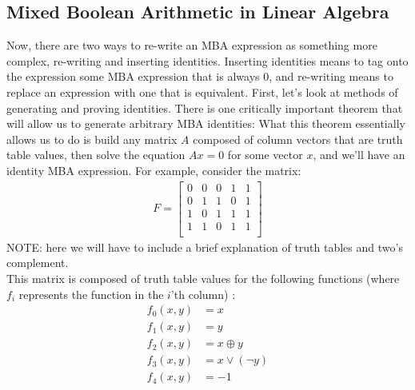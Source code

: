 \subsection{Mixed Boolean Arithmetic in Linear Algebra}
Now, there are two ways to re-write an MBA expression as something more complex, 
re-writing and inserting identities. Inserting identities means to tag onto
the expression some MBA expression that is always 0, and re-writing means to 
replace an expression with one that is equivalent. First, let's look at methods
of generating and proving identities. There is one critically important theorem 
that will allow us to generate arbitrary MBA identities:
What this theorem essentially allows us to do is build any matrix $A$
composed of column vectors that are truth table values, then solve the 
equation $Ax = 0$ for some vector $x$, and we'll have an identity MBA expression.
For example, consider the matrix:
\begin{align*}
    F = \begin{bmatrix}
        0 & 0 & 0 & 1 & 1\\
        0 & 1 & 1 & 0 & 1\\
        1 & 0 & 1 & 1 & 1\\
        1 & 1 & 0 & 1 & 1\\
    \end{bmatrix}
\end{align*}
{\color{blue} NOTE: here we will have to include a brief explanation of truth tables and two's 
complement.\\}
This matrix is composed of truth table values for the following functions (where 
$f_i$ represents the function in the $i$'th column) :
\begin{align*}
    f_0(x,y) &= x\\
    f_1(x,y) &= y\\
    f_2(x,y) &= x \oplus y\\
    f_3(x,y) &= x \lor (\neg y)\\
    f_4(x,y) &= -1
\end{align*}
